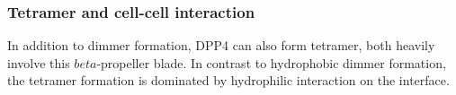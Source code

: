 \subsubsection{Tetramer and cell-cell interaction}

In addition to dimmer formation, DPP4 can also form tetramer, both heavily involve this $beta$-propeller blade. In contrast to hydrophobic dimmer formation, the tetramer formation is dominated by hydrophilic interaction on the interface.~\cite{Engel_2003} 
